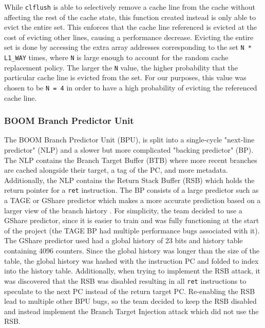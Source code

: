 While {\tt clflush} is able to selectively remove a cache line from the cache without 
affecting the rest of the cache state, this function created instead is only able to evict the entire set.
This enforces that the cache line referenced is evicted at the cost of evicting other lines, causing a performance
decrease. Evicting the entire set is done by accessing the extra array addresses corresponding to the set 
{\tt N * L1\_WAY} times, where {\tt N} is large enough to account for the random cache replacement policy. The larger
the {\tt N} value, the higher probability that the particular cache line is evicted from the set. For our purposes, this value
was chosen to be {\tt N = 4} in order to have a high probability of evicting the referenced cache line.

\subsubsection{BOOM Branch Predictor Unit}


The BOOM Branch Predictor Unit (BPU), is split into a single-cycle "next-line predictor" (NLP) and a
slower but more complicated "backing predictor" (BP). The NLP contains the Branch Target Buffer (BTB) 
where more recent branches are cached alongside their target, a tag of the PC, and more metadata. Additionally,
the NLP contains the Return Stack Buffer (RSB) which holds the return pointer for a {\tt ret} instruction. The BP
consists of a large predictor such as a TAGE or GShare predictor which makes a more accurate prediction based on
a larger view of the branch history \cite{b47}. For simplicity, the team decided to use a GShare predictor, since it is 
easier to train and was fully functioning at the start of the project (the TAGE BP had multiple performance bugs
associated with it). The GShare predictor used had a global history of 23 bits and history table containing
4096 counters. Since the global history was longer than the size of the table, the global history was hashed with
the instruction PC and folded to index into the history table. Additionally, when trying to
implement the RSB attack, it was discovered that the RSB was disabled resulting in all {\tt ret} instructions
to speculate to the next PC instead of the return target PC. Re-enabling the RSB lead to multiple other BPU bugs,
so the team decided to keep the RSB disabled and instead implement the Branch Target Injection attack which did not
use the RSB.

